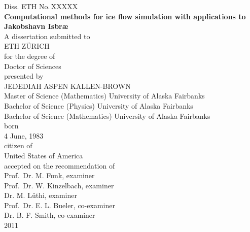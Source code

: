\begin{titlepage}
  \begin{center}
    \large
    Diss. ETH No.\,XXXXX\\ 
    \vspace{2.0cm} 
    \LARGE
    \textbf{
      Computational methods for ice flow simulation with applications to Jakobshavn Isbr{\ae}
    }
    \large
    \\    
    \vspace{1.5cm}
    A dissertation submitted to\\[0.5em]

    ETH Z\"URICH \\[2.0em]


    for the degree of \\[0.5em]

    Doctor of Sciences\\[3.0em]


    presented by \\[0.5em]

    JEDEDIAH ASPEN KALLEN-BROWN \\[0.5em]

    Master of Science (Mathematics) University of Alaska Fairbanks \\
    Bachelor of Science (Physics) University of Alaska Fairbanks \\
    Bachelor of Science (Mathematics) University of Alaska Fairbanks \\[2.0em]

    born\\[0.5em]
    4 June, 1983\\[2.0em]

    citizen of\\[0.5em]

    United States of America\\[3.0em]



    accepted on the recommendation of\\[1.0em]

    Prof.~Dr. M. Funk, examiner\\[0.5em]

    Prof.~Dr. W. Kinzelbach, examiner\\[0.5em]

    Dr. M. L\"uthi, examiner\\[0.5em]

    Prof.~Dr. E. L. Bueler, co-examiner\\[0.5em]

    Dr. B. F. Smith, co-examiner\\[5.0em]

    2011\\
  \end{center}
\end{titlepage}


